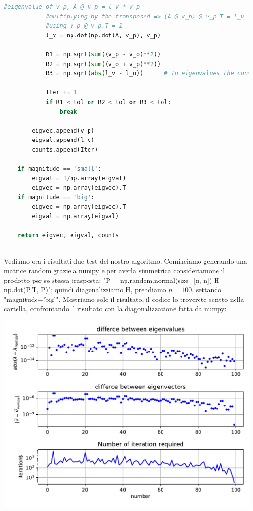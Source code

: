 \documentclass[10pt,a4paper]{article}
\begin{document}
\begin{lstlisting}[language=Python]
            #eigenvalue of v_p, A @ v_p = l_v * v_p
            #multiplying by the transposed => (A @ v_p) @ v_p.T = l_v
            #using v_p @ v_p.T = 1
            l_v = np.dot(np.dot(A, v_p), v_p)
            
            R1 = np.sqrt(sum((v_p - v_o)**2))
            R2 = np.sqrt(sum((v_o + v_p)**2))
            R3 = np.sqrt(abs(l_v - l_o))      # In eigenvalues the convergence is quadratic

            Iter += 1
            if R1 < tol or R2 < tol or R3 < tol:
                break

        eigvec.append(v_p)
        eigval.append(l_v)
        counts.append(Iter)
    
    if magnitude == 'small':
        eigval = 1/np.array(eigval)
        eigvec = np.array(eigvec).T
    if magnitude == 'big':
        eigvec = np.array(eigvec).T
        eigval = np.array(eigval)

    return eigvec, eigval, counts
    
\end{lstlisting}

Vediamo ora i risultati due test del nostro algoritmo. Cominciamo generando una matrice random grazie a numpy e per averla simmetrica consideriamone il prodotto per se stessa trasposta: "P = np.random.normal(size=[n, n]) H = np.dot(P.T, P)"; quindi diagonalizziamo H, prendiamo $n=100$, settando "magnitude='big'". Mostriamo solo il risultato, il codice lo troverete scritto nella cartella, confrontando il risultato con la diagonalizzazione fatta da numpy:

\begin{center}
\includegraphics[scale=0.7]{img/cfr_eig.pdf}
\end{center}
\end{document}
